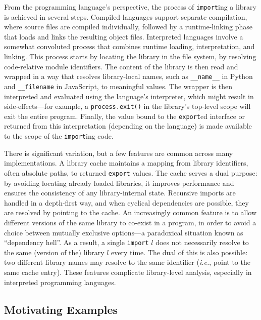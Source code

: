 \documentclass[letterpaper,twocolumn,10pt]{article}
\def\ie{{\em i.e.}, }
\newcommand{\ttt}[1]{\texttt{#1}}
\begin{document}
From the programming language's perspective, the process of \ttt{import}ing a library is achieved in several steps. 
Compiled languages support separate compilation, where source files are compiled individually, followed by a runtime-linking phase that loads and links the resulting object files.
Interpreted languages involve a somewhat convoluted process that combines runtime loading, interpretation, and linking.
This process starts by locating the library in the file system,
by resolving code-relative module identifiers.
The content of the library is then read and wrapped in a way that resolves library-local names, such as \ttt{\_\_name\_\_} in Python and \ttt{\_\_filename} in JavaScript, to meaningful values.
The wrapper is then interpreted and evaluated using the language's interpreter, which might result in side-effects---for example, a \ttt{process.exit()} in the library's top-level scope will exit the entire program.
Finally, the value bound to the \ttt{export}ed interface or returned from this interpretation (depending on the language) is made available to the scope of the  \ttt{import}ing code.

There is significant variation, but a few features are common across many implementations.
A library cache maintains a mapping from library identifiers, often absolute paths, to returned \ttt{export} values.
The cache serves a dual purpose:
  by avoiding locating already loaded libraries, it improves performance and ensures the consistency of any library-internal state.
Recursive imports are handled in a depth-first way, and when cyclical dependencies are possible, they are resolved by pointing to the cache.
An increasingly common feature is to allow different versions of the same library to co-exist in a program, in order to avoid a choice between mutually exclusive options---a paradoxical situation known as ``dependency hell''.
As a result, a single \ttt{import} $l$ does not necessarily resolve to the same (version of the) library $l$ every time.
The dual of this is also possible:
   two different library names may resolve to the same identifier (\ie point to the same cache entry).
These features complicate library-level analysis, especially in interpreted programming languages.


\subsection{Motivating Examples}
\label{examples}
\end{document}

